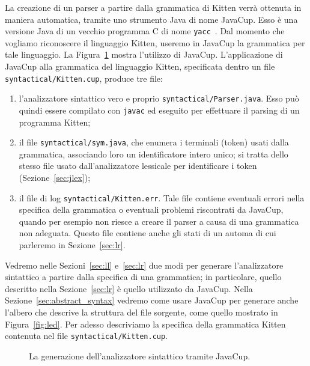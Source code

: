 La creazione di un parser a partire dalla grammatica di
Kitten verr\`a ottenuta in maniera automatica, tramite uno strumento Java
di nome JavaCup. Esso \`e una versione Java di un vecchio programma C
di nome \texttt{yacc}~\cite{Johnson75}.
Dal momento che vogliamo riconoscere il linguaggio Kitten, useremo
in JavaCup la grammatica per tale linguaggio.
La Figura~\ref{fig:java_cup} mostra l'utilizzo di JavaCup.
L'applicazione di JavaCup alla grammatica del linguaggio
Kitten, specificata dentro un file \texttt{syntactical/Kitten.cup},
produce tre file:
%
\begin{enumerate}
\item l'analizzatore sintattico vero e proprio
      \texttt{syntactical/Parser.java}. Esso pu\`o quindi
      essere compilato con \texttt{javac} ed eseguito per effettuare il parsing
      di un programma Kitten;
\item il file \texttt{syntactical/sym.java}, che enumera i terminali
      (token) usati dalla grammatica, associando loro un identificatore
      intero unico; si tratta dello stesso file usato dall'analizzatore
      lessicale per identificare i token (Sezione~\ref{sec:jlex});
\item il file di log \texttt{syntactical/Kitten.err}. Tale file contiene
      eventuali errori nella specifica della grammatica o eventuali
      problemi riscontrati da JavaCup, quando per esempio non riesce a
      creare il parser a causa di una grammatica non adeguata.
      Questo file contiene anche gli stati di un automa di cui parleremo
      in Sezione~\ref{sec:lr}.
\end{enumerate}
%

Vedremo nelle Sezioni~\ref{sec:ll} e~\ref{sec:lr} due modi per
generare l'analizzatore sintattico a partire dalla specifica di una grammatica;
in particolare, quello descritto nella Sezione~\ref{sec:lr} \`e quello
utilizzato da JavaCup. Nella Sezione~\ref{sec:abstract_syntax} vedremo
come usare JavaCup per generare anche l'albero che descrive la struttura
del file sorgente, come quello mostrato in Figura~\ref{fig:led}.
Per adesso descriviamo la specifica della grammatica
Kitten contenuta nel file \texttt{syntactical/Kitten.cup}.
%
\begin{figure}[t]
\begin{center}
\end{center}
\caption{La generazione dell'analizzatore sintattico tramite JavaCup.}
  \label{fig:java_cup}
\end{figure}
%
